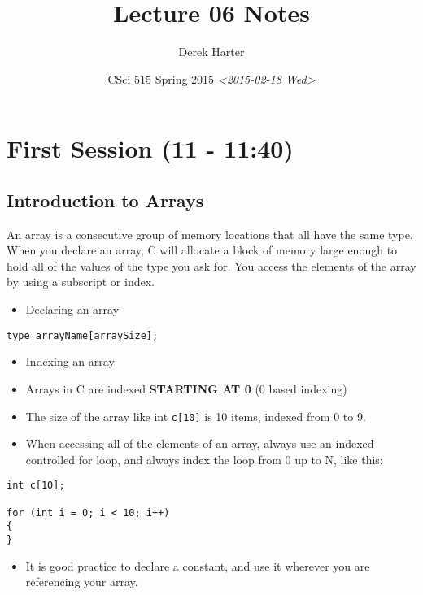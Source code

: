 \documentclass[11pt]{article}
\author{Derek Harter}
\date{CSci 515 Spring 2015 \textit{<2015-02-18 Wed>}}
\title{Lecture 06 Notes}
\begin{document}
\maketitle

\section{First Session (11 - 11:40)}
\label{sec-1}
\subsection{Introduction to Arrays}
\label{sec-1-1}
An array is a consecutive group of memory locations that all have the
same type.  When you declare an array, C will allocate a block of memory
large enough to hold all of the values of the type you ask for.  You access
the elements of the array by using a subscript or index.

\begin{itemize}
\item Declaring an array
\end{itemize}

\begin{verbatim}
type arrayName[arraySize];
\end{verbatim}

\begin{itemize}
\item Indexing an array
\item Arrays in C are indexed \textbf{STARTING AT 0} (0 based indexing)
\item The size of the array like int \verb~c[10]~ is 10 items, indexed from 0 to 9.
\item When accessing all of the elements of an array, always use an indexed
controlled for loop, and always index the loop from 0 up to N, like this:
\end{itemize}

\begin{verbatim}
int c[10];

for (int i = 0; i < 10; i++)
{
}
\end{verbatim}

\begin{itemize}
\item It is good practice to declare a constant, and use it wherever you are
referencing your array.
\end{itemize}
\end{document}
